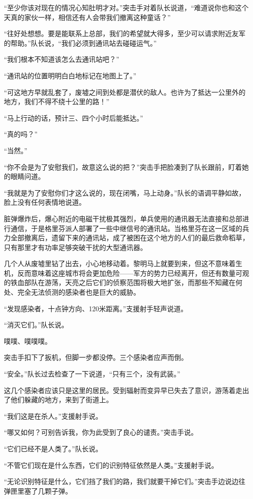 “至少你该对现在的情况心知肚明才对。”突击手对着队长说道，“难道说你也和这个天真的家伙一样，相信还有人会带我们撤离这种童话？”

“往好处想想。要是能联系上总部，我们的希望就大得多，至少可以请求附近友军的帮助。”队长说，“我们必须到通讯站去碰碰运气。”

“我们根本不知道该怎么去通讯站吧？”

“通讯站的位置明明白白地标记在地图上了。”

“可这地方早就乱套了，废墟之间到处都是潜伏的敌人。也许为了抵达一公里外的地方，我们不得不绕十公里的路！”

“马上行动的话，预计三、四个小时后能抵达。”

“真的吗？”

“当然。”

“你不会是为了安慰我们，故意这么说的把？”突击手把脸凑到了队长跟前，盯着她的眼睛问道。

“我就是为了安慰你们才这么说的，现在闭嘴，马上动身。”队长的语调平静如故，脸上没有任何表情地说道。

脏弹爆炸后，爆心附近的电磁干扰极其强烈，单兵使用的通讯器无法直接和总部进行通信，于是格里芬派人部署了一些中继信号的通讯站。当格里芬在这一区域的兵力全部撤离后，遗留下来的通讯站，成了被困在这个地方的人们的最后救命稻草，只有那里才有功率足够突破干扰的大型通讯器。

几个人从废墟里钻了出去，小心地移动着。黎明马上就要到来，但这不意味着生机，反而意味着这座城市将会更加危险——军方的势力已经离开，但还有数量可观的铁血部队在游荡，天亮之后它们的侦察范围将极大地扩张，而那些不知藏在何处、完全无法侦测的感染者也是巨大的威胁。

“发现感染者，十点钟方向、120米距离。”支援射手轻声说道。

“消灭它们。”队长说。

噗噗、噗噗噗。

突击手扣下了扳机，但脚一步都没停。三个感染者应声而倒。

“安全。”队长过去检查了一下说道，“只有三个，没有武装。”

这几个感染者应该只是这里的居民。受到辐射而变异早已失去了意识，游荡着走出了他们躲藏的地方，来到了街道上。

“我们这是在杀人。”支援射手说。

“哪又如何？可别告诉我，你为此受到了良心的谴责。”突击手说。

“它们已经不是人类了。”队长说。

“不管它们现在是什么东西，它们的识别特征依然是人类。”支援射手说。

“无论识别特征是什么，它们挡了我们的路，我们就要干掉它们。”突击手边说边往弹匣里塞了几颗子弹。

